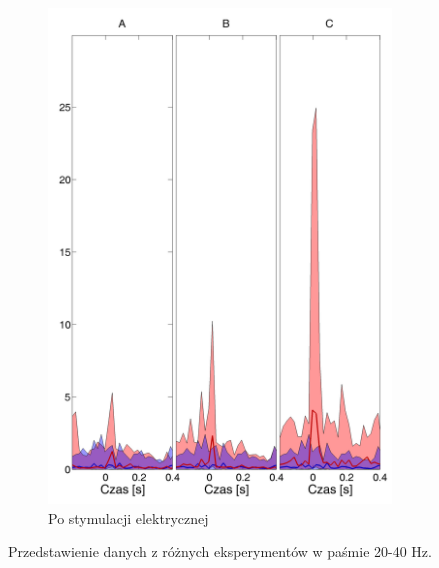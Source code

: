 \documentclass{pracamgr}
\begin{document}
\begin{figure}[h]
\begin{subfigure}{.5\textwidth}
			\includegraphics[width=1.\linewidth]{beta3_20-40_z_CxC5_do_LGN42.png}
			\caption{Po stymulacji elektrycznej}
			\label{rys:20_40_beta_CxC_LGN}
		\end{subfigure}
		\caption{Przedstawienie danych z różnych eksperymentów w paśmie 20-40 Hz.}
		\label{rys:20_40_CxC_LGN}
	\end{figure}
	\FloatBarrier
\end{document}
